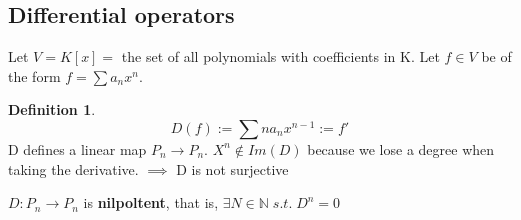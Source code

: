\documentclass[12pt]{article}
\theoremstyle{definition}
\newtheorem{definition}{Definition}[section]
\theoremstyle{remark}
\begin{document}
\subsection{Differential operators}
        Let $V=K[x]=$ the set of all polynomials with coefficients in K. Let $f\in V$ be of the form $f= \sum a_n x^n$.
        \begin{definition}
            $$D(f):= \sum na_n x^{n-1} := f'$$
            D defines a linear map $P_n \rightarrow P_n$. $X^n \notin Im(D)$ because we lose a degree when taking the derivative. 
            $\implies$ D is not surjective
        \end{definition}
        \begin{proposition}
            $D: P_n \rightarrow P_n$ is \textbf{nilpoltent}, that is, $\exists N\in \mathbb{N} \; s.t. \; D^n = 0$
        \end{proposition}
\end{document}
